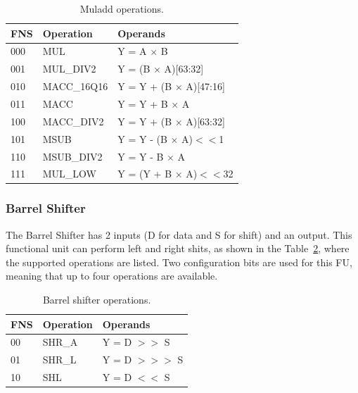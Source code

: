 \begin{table}[!htb]
	\renewcommand{\arraystretch}{1.2} %
	\caption{Muladd operations.}
	\label{tab:muladd}
	\centering
	\begin{tabular}{lll}
		\toprule
		FNS & Operation   &                       Operands\\
		\midrule
		000 & MUL         &               Y = A $\times$ B\\
		001 & MUL\_DIV2   &      Y = (B $\times$ A)[63:32]\\
		010 & MACC\_16Q16 &  Y = Y + (B $\times$ A)[47:16]\\
		011 & MACC        &           Y = Y + B $\times$ A\\
		100 & MACC\_DIV2  &  Y = Y + (B $\times$ A)[63:32]\\
		101 & MSUB        &    Y = Y - (B $\times$ A)$<<$1\\
		110 & MSUB\_DIV2  &           Y =  Y - B $\times$ A\\
		111 & MUL\_LOW    &    Y = (Y + B $\times$ A)$<<$32\\
		\bottomrule
	\end{tabular}
\end{table}

\subsubsection{Barrel Shifter}
\label{subsubsection:bs}

The Barrel Shifter has 2 inputs (D for data and S for shift) and an output. This
functional unit can perform left and right shits, as shown in the
Table~\ref{tab:bs}, where the supported operations are listed. Two configuration
bits are used for this \ac{FU}, meaning that up to four operations are
available.

\begin{table}[!htb]
	\renewcommand{\arraystretch}{1.2} %
	\caption{Barrel shifter operations.}
	\label{tab:bs}
	\centering
	\begin{tabular}{lll}
		\toprule
		FNS & Operation   &       Operands\\
		\midrule
		00  & SHR\_A      &   Y = D $>>$ S\\
		01  & SHR\_L      &  Y = D $>>>$ S\\%
		10  & SHL         &   Y = D $<<$ S\\
		\bottomrule
	\end{tabular}
\end{table}

